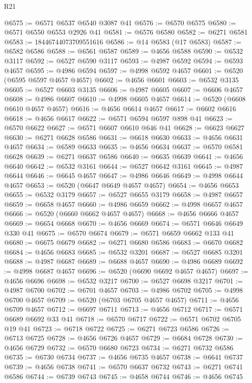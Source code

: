 \begin{lexlean}{R21}
\begin{coremodule}
@6575 := @6571 @6537 @6540 @3087 @41
@6576 := @6570 @6575
@6580 := @6571 @6550 @6553 @2926 @41
@6581 := @6576 @6580
@6582 := @6271 @6581
@6583 := 18446744073709551616
@6586 := @14 @6583 (@17 @6583)
@6587 := @6582 @6586
@6588 := @6561 @6587
@6589 := @4656 @6588
@6590 := @6532 @3117
@6592 := @6527 @6590 @3117
@6593 := @4987 @6592
@6594 := @6593 @4657
@6595 := @4986 @6594
@6597 := @4998 @6592 @4657
@6601 := @6520 (@6595 @6597 @4657 @4657)
@6602 := @4656 @6601
@6603 := @6532 @3135
@6605 := @6527 @6603 @3135
@6606 := @4987 @6605
@6607 := @6606 @4657
@6608 := @4986 @6607
@6610 := @4998 @6605 @4657
@6614 := @6520 (@6608 @6610 @4657 @4657)
@6616 := @4656 @6614 @4657
@6617 := @6602 @6616
@6618 := @4656 @6617
@6622 := @6571 @6594 @6597 @898 @41
@6623 := @6570 @6622
@6627 := @6571 @6607 @6610 @646 @41
@6628 := @6623 @6627
@6630 := @6271 @6628 @6586
@6631 := @6618 @6630
@6633 := @4656 @6631 @4657
@6634 := @6589 @6633
@6635 := @4656 @6634
@6637 := @6570 @6581 @6628
@6639 := @6271 @6637 @6586
@6640 := @6635 @6639
@6641 := @4656 @6640
@6642 := @6532 @3161
@6644 := @6527 @6642 @3161
@6645 := @4987 @6644
@6646 := @6645 @4657
@6647 := @4986 @6646
@6649 := @4998 @6644 @4657
@6653 := @6520 (@6647 @6649 @4657 @4657)
@6654 := @4656 @6653
@6655 := @6532 @3179
@6657 := @6527 @6655 @3179
@6658 := @4987 @6657
@6659 := @6658 @4657
@6660 := @4986 @6659
@6662 := @4998 @6657 @4657
@6666 := @6520 (@6660 @6662 @4657 @4657)
@6668 := @4656 @6666 @4657
@6669 := @6654 @6668
@6670 := @4656 @6669
@6674 := @6571 @6646 @6649 @330 @41
@6675 := @6570 @6674
@6679 := @6571 @6659 @6662 @133 @41
@6680 := @6675 @6679
@6682 := @6271 @6680 @6586
@6683 := @6670 @6682
@6684 := @4656 @6683
@6685 := @6532 @3201
@6687 := @6527 @6685 @3201
@6688 := @4987 @6687
@6689 := @6688 @4657
@6690 := @4986 @6689
@6692 := @4998 @6687 @4657
@6696 := @6520 (@6690 @6692 @4657 @4657)
@6697 := @4656 @6696
@6698 := @6532 @3217
@6700 := @6527 @6698 @3217
@6701 := @4987 @6700
@6702 := @6701 @4657
@6703 := @4986 @6702
@6705 := @4998 @6700 @4657
@6709 := @6520 (@6703 @6705 @4657 @4657)
@6711 := @4656 @6709 @4657
@6712 := @6697 @6711
@6713 := @4656 @6712
@6717 := @6571 @6689 @6692 @33 @41
@6718 := @6570 @6717
@6722 := @6571 @6702 @6705 @19 @41
@6723 := @6718 @6722
@6725 := @6271 @6723 @6586
@6726 := @6713 @6725
@6728 := @4656 @6726 @4657
@6729 := @6684 @6728
@6730 := @4656 @6729
@6732 := @6570 @6680 @6723
@6734 := @6271 @6732 @6586
@6735 := @6730 @6734
@6737 := @4656 @6735 @4657
@6738 := @6641 @6737
@6739 := @4656 @6738
@6741 := @6570 @6637 @6732
@6743 := @6271 @6741 @6586
@6744 := @6739 @6743
@6745 := @4658 @6744
@6746 := @4656 @6745

\end{coremodule}
\end{lexlean}
